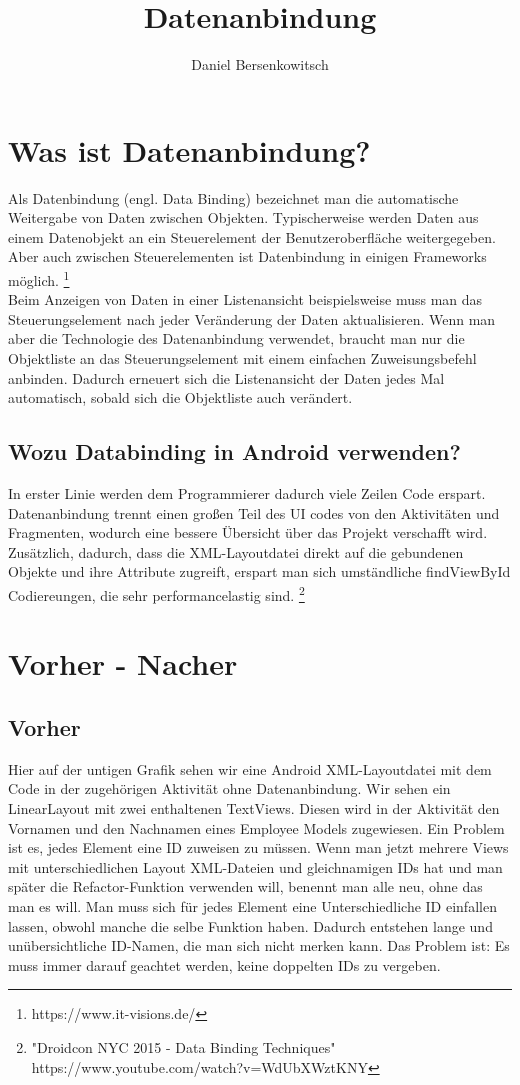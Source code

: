 \documentclass[FIPLY_base.tex]{subfiles}
\title{Datenanbindung}
\author{Daniel Bersenkowitsch}
\begin{document}
\section{Was ist Datenanbindung?}
Als Datenbindung (engl. Data Binding) bezeichnet man die automatische Weitergabe von Daten zwischen Objekten. Typischerweise werden Daten aus einem Datenobjekt an ein Steuerelement der Benutzeroberfläche weitergegeben. Aber auch zwischen Steuerelementen ist Datenbindung in einigen Frameworks möglich. \footnote{https://www.it-visions.de/}\\
Beim Anzeigen von Daten in einer Listenansicht beispielsweise muss man das Steuerungselement nach jeder Veränderung der Daten aktualisieren. Wenn man aber die Technologie des Datenanbindung verwendet, braucht man nur die Objektliste an das Steuerungselement mit einem einfachen Zuweisungsbefehl anbinden. Dadurch erneuert sich die Listenansicht der Daten jedes Mal automatisch, sobald sich die Objektliste auch verändert.

\subsection{Wozu Databinding in Android verwenden?}
In erster Linie werden dem Programmierer dadurch viele Zeilen Code erspart. Datenanbindung trennt einen großen Teil des UI codes von den Aktivitäten und Fragmenten, wodurch eine bessere Übersicht über das Projekt verschafft wird. Zusätzlich, dadurch, dass die XML-Layoutdatei direkt auf die gebundenen Objekte und ihre Attribute zugreift, erspart man sich umständliche findViewById Codiereungen, die sehr performancelastig sind. \footnote{"Droidcon NYC 2015 - Data Binding Techniques" \\ https://www.youtube.com/watch?v=WdUbXWztKNY}


\section{Vorher - Nacher}
\subsection{Vorher}

Hier auf der untigen Grafik sehen wir eine Android XML-Layoutdatei mit dem Code in der zugehörigen Aktivität ohne Datenanbindung. Wir sehen ein LinearLayout mit zwei enthaltenen TextViews. Diesen wird in der Aktivität den Vornamen und den Nachnamen eines Employee Models zugewiesen. Ein Problem ist es, jedes Element eine ID zuweisen zu müssen. Wenn man jetzt mehrere Views mit unterschiedlichen Layout XML-Dateien und gleichnamigen IDs hat und man später die Refactor-Funktion verwenden will, benennt man alle neu, ohne das man es will. Man muss sich für jedes Element eine Unterschiedliche ID einfallen lassen, obwohl manche die selbe Funktion haben. Dadurch entstehen lange und unübersichtliche ID-Namen, die man sich nicht merken kann. Das Problem ist: Es muss immer darauf geachtet werden, keine doppelten IDs zu vergeben.\\
\end{document}
